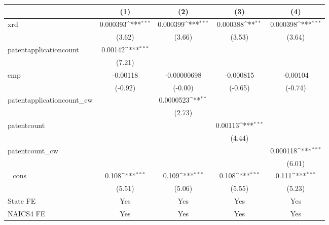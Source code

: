 {
\def\sym#1{\ifmmode^{#1}\else\(^{#1}\)\fi}
\begin{tabular}{l*{4}{c}}
\hline\hline
            &\multicolumn{1}{c}{(1)}         &\multicolumn{1}{c}{(2)}         &\multicolumn{1}{c}{(3)}         &\multicolumn{1}{c}{(4)}         \\
\hline
xrd         &    0.000393\sym{***}&    0.000399\sym{***}&    0.000388\sym{**} &    0.000398\sym{***}\\
            &      (3.62)         &      (3.66)         &      (3.53)         &      (3.64)         \\
[1em]
patentapplicationcount&     0.00142\sym{***}&                     &                     &                     \\
            &      (7.21)         &                     &                     &                     \\
[1em]
emp         &    -0.00118         & -0.00000698         &   -0.000815         &    -0.00104         \\
            &     (-0.92)         &     (-0.00)         &     (-0.65)         &     (-0.74)         \\
[1em]
patentapplicationcount\_cw&                     &   0.0000523\sym{**} &                     &                     \\
            &                     &      (2.73)         &                     &                     \\
[1em]
patentcount &                     &                     &     0.00113\sym{***}&                     \\
            &                     &                     &      (4.44)         &                     \\
[1em]
patentcount\_cw&                     &                     &                     &    0.000118\sym{***}\\
            &                     &                     &                     &      (6.01)         \\
[1em]
\_cons      &       0.108\sym{***}&       0.109\sym{***}&       0.108\sym{***}&       0.111\sym{***}\\
            &      (5.51)         &      (5.06)         &      (5.55)         &      (5.23)         \\
[1em]
State FE    &         Yes         &         Yes         &         Yes         &         Yes         \\
[1em]
NAICS4 FE   &         Yes         &         Yes         &         Yes         &         Yes         \\

\end{tabular}}
